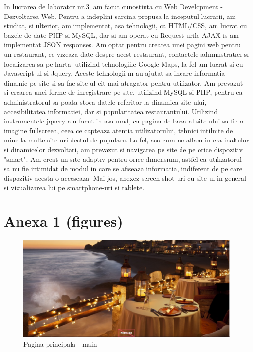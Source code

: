 \documentclass[11pt]{article}
\begin{document}
In lucrarea de laborator nr.3, am facut cunostinta cu Web Development - Dezvoltarea Web.
Pentru a indeplini sarcina propusa la inceputul lucrarii, am studiat, si ulterior, am implementat, asa tehnologii, ca
HTML/CSS, am lucrat cu bazele de date PHP si MySQL, dar si am operat cu Request-urile AJAX is am implementat JSON responses.
Am optat pentru crearea unei pagini web pentru un restaurant, ce vizeaza date despre  acest restaurant, contactele administratiei si localizarea sa pe harta, utilizind tehnologiile Google Maps, la fel am lucrat si cu Javascript-ul si Jquery.
Aceste tehnologii m-au ajutat sa incarc informatia dinamic pe site si sa fac site-ul cit mai atragator pentru utilizator.
Am prevazut si crearea unei forme de inregistrare pe site, utilizind MySQL si PHP, pentru ca administratorul sa poata stoca datele referitor la dinamica site-ului, accesibilitatea informatiei, dar si popularitatea restaurantului.
Utilizind instrumentele jquery am facut in asa mod, ca pagina de baza al site-ului sa fie o imagine fullscreen, ceea ce capteaza atentia utilizatorului, tehnici intilnite de mine la multe site-uri destul de populare.
La fel, asa cum ne aflam in era inaltelor si dinamicelor dezvoltari, am prevazut si navigarea pe site de pe orice dispozitiv "smart". Am creat un site adaptiv pentru orice dimensiuni, astfel ca utilizatorul sa nu fie intimidat de modul in care se afiseaza informatia, indiferent de pe care dispozitiv acesta o acceseaza.
Mai jos, anexez screen-shot-uri cu site-ul in general si vizualizarea lui pe smartphone-uri si tablete.

\section{Anexa 1 (figures)}

\begin{figure}[h]
\includegraphics{images/1.eps}
\caption{Pagina principala - main}
\end{figure}
\end{document}

